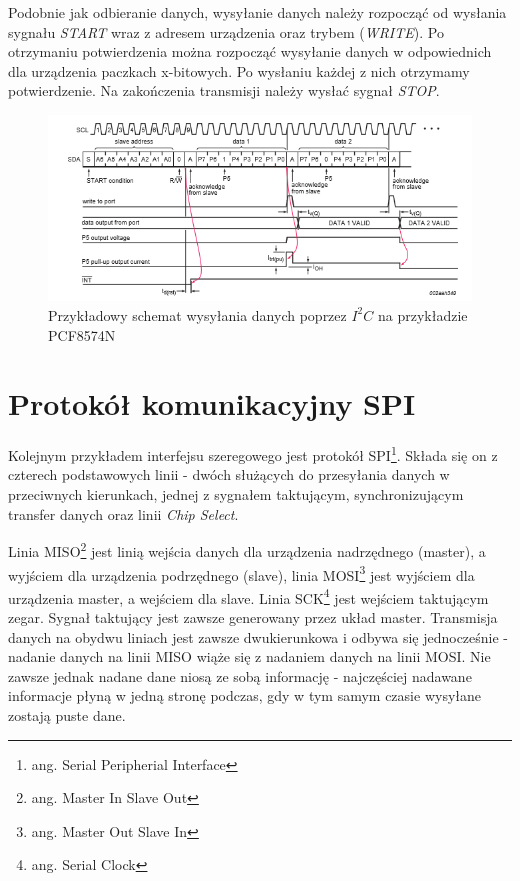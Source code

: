 \documentclass{xmgr}
\begin{document}
Podobnie jak odbieranie danych, wysyłanie danych należy rozpocząć od wysłania sygnału \emph{START} wraz z adresem urządzenia oraz trybem (\emph{WRITE}). Po otrzymaniu potwierdzenia można rozpocząć wysyłanie danych w odpowiednich dla urządzenia paczkach x-bitowych. Po wysłaniu każdej z nich otrzymamy potwierdzenie. Na zakończenia transmisji należy wysłać sygnał \emph{STOP}.

\begin{figure}[!h]
    \centering
    \includegraphics[height=0.2\textheight]{images/write_i2c.png}
    \caption{Przykładowy schemat wysyłania danych poprzez $I^2C$ na przykładzie PCF8574N\label{$I^2C$}}
\end{figure}

\section{Protokół komunikacyjny SPI}
Kolejnym przykładem interfejsu szeregowego jest protokół SPI\footnote{ang. Serial Peripherial Interface}. Składa się on z czterech podstawowych linii - dwóch służących do przesyłania danych w przeciwnych kierunkach, jednej z sygnałem taktującym, synchronizującym transfer danych oraz linii \emph{Chip Select}. 

Linia MISO\footnote{ang. Master In Slave Out} jest linią wejścia danych dla urządzenia nadrzędnego (master), a wyjściem dla urządzenia podrzędnego (slave), linia MOSI\footnote{ang. Master Out Slave In} jest wyjściem dla urządzenia master, a wejściem dla slave. Linia SCK\footnote{ang. Serial Clock} jest wejściem taktującym zegar. Sygnał taktujący jest zawsze generowany przez układ master. Transmisja danych na obydwu liniach jest zawsze dwukierunkowa i odbywa się jednocześnie - nadanie danych na linii MISO wiąże się z nadaniem danych na linii MOSI. Nie zawsze jednak nadane dane niosą ze sobą informację - najczęściej nadawane informacje płyną w jedną stronę podczas, gdy w tym samym czasie wysyłane zostają puste dane.\cite{Dorra}
\end{document}
